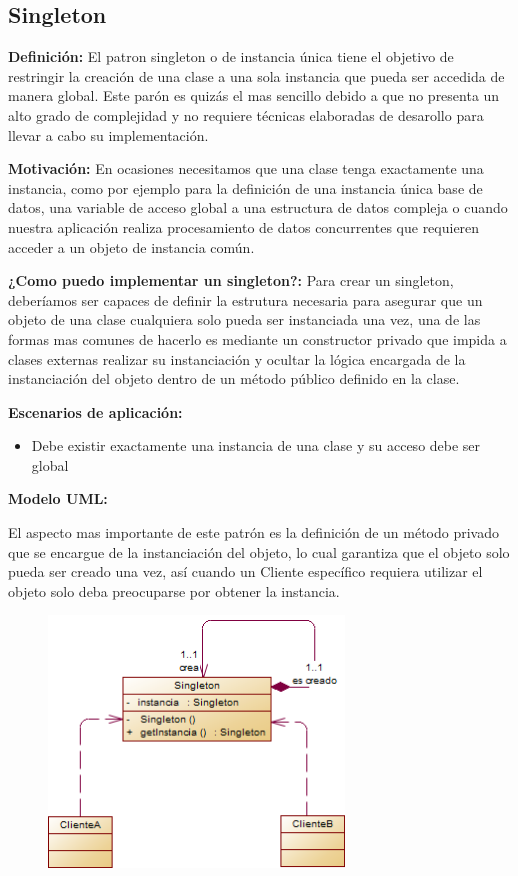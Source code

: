 \subsection{Singleton}

\textbf{Definición:} El patron singleton o de instancia única tiene el objetivo de restringir la creación de una clase a una sola instancia que pueda ser accedida de manera global. Este parón es quizás el mas sencillo debido a que no presenta un alto grado de complejidad y no requiere técnicas elaboradas de desarollo para llevar a cabo su implementación.

\textbf{Motivación:} En ocasiones necesitamos que una clase tenga exactamente una instancia, como por ejemplo para la definición de una instancia única base de datos, una variable de acceso global a una estructura de datos compleja o cuando nuestra aplicación realiza procesamiento de datos concurrentes que requieren acceder a un objeto de instancia común.

\textbf{¿Como puedo implementar un singleton?:} Para crear un singleton, deberíamos ser capaces de definir la estrutura necesaria para asegurar que un objeto de una clase cualquiera solo pueda ser instanciada una vez, una de las formas mas comunes de hacerlo es mediante un constructor privado que impida a clases externas realizar su instanciación y ocultar la lógica encargada de la instanciación del objeto dentro de un método público definido en la clase.

\textbf{Escenarios de aplicación:}

\begin{itemize}
	\item Debe existir exactamente una instancia de una clase y su acceso debe ser global
\end{itemize}

\textbf{Modelo UML:}

El aspecto mas importante de este patrón es la definición de un método privado que se encargue de la instanciación del objeto, lo cual garantiza que el objeto solo pueda ser creado una vez, así cuando un Cliente específico requiera utilizar el objeto solo deba preocuparse por obtener la instancia.

\begin{figure}[H]
	\includegraphics[width=0.7\textwidth]{images/creational/singleton/singleton.png}
\end{figure}

